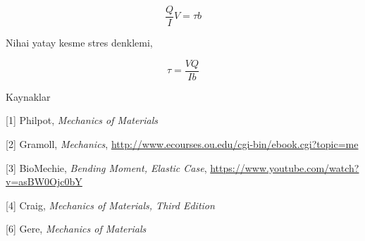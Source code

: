 \documentclass[12pt,fleqn]{article}\usepackage{../../common}
\begin{document}
$$
\frac{Q}{I} V = \tau b
$$

Nihai yatay kesme stres denklemi,

$$
\tau = \frac{V Q}{I b}
$$

Kaynaklar

[1] Philpot, {\em Mechanics of Materials}

[2] Gramoll, {\em Mechanics},
    \url{http://www.ecourses.ou.edu/cgi-bin/ebook.cgi?topic=me}

[3] BioMechie, {\em Bending Moment, Elastic Case},
    \url{https://www.youtube.com/watch?v=asBW0Ojc0bY}
    
[4] Craig, {\em Mechanics of Materials, Third Edition}

[6] Gere, {\em Mechanics of Materials}
\end{document}
